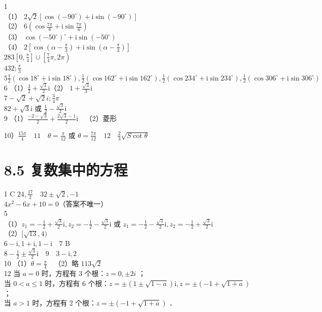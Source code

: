 \documentclass[10pt]{article}
\begin{document}
1\\
（1） \(2 \sqrt{2}\left[\cos \left(-90^{\circ}\right)+\mathrm{i} \sin \left(-90^{\circ}\right)\right]\)\\
（2） \(6\left(\cos \frac{7 \pi}{6}+\mathrm{i} \sin \frac{7 \pi}{6}\right)\)\\
（3） \(\cos \left(-50^{\circ}\right)^{\circ}+\mathrm{i} \sin \left(-50^{\circ}\right)\)\\
（4） \(2\left[\cos \left(\alpha-\frac{\pi}{3}\right)+\mathrm{i} \sin \left(\alpha-\frac{\pi}{3}\right)\right]\)\\
\(283\left[0, \frac{\pi}{4}\right] \cup\left[\frac{7}{4} \pi, 2 \pi\right)\)\\
\(432 ; \frac{\pi}{3}\)\\
\(5 \frac{1}{2}\left(\cos 18^{\circ}+\mathrm{i} \sin 18^{\circ}\right), \frac{1}{2}\left(\cos 162^{\circ}+\mathrm{i} \sin 162^{\circ}\right), \frac{1}{2}\left(\cos 234^{\circ}+\mathrm{i} \sin 234^{\circ}\right), \frac{1}{2}\left(\cos 306^{\circ}+\mathrm{i} \sin 306^{\circ}\right)\)\\
6 （1）\(\frac{3}{2}+\frac{\sqrt{3}}{2} \mathrm{i}\)（2） \(1+\frac{\sqrt{3}}{3} \mathrm{i}\)\\
\(7-\sqrt{2}+\sqrt{2} i ; \frac{3}{4} \pi\)\\
\(82+\sqrt{3} \mathrm{i}\) 或 \(\frac{1}{2}-\frac{\sqrt{3}}{2} \mathrm{i}\)\\
9 （1）\(\frac{-2-\sqrt{3}}{2}+\frac{2 \sqrt{3}-1}{2} \mathrm{i} \quad\)（2）菱形

10）\(\frac{15 \pi}{4} \quad 11 \quad \theta=\frac{\pi}{12}\) 或 \(\theta=\frac{7 \pi}{12} \quad 12 \quad \frac{2}{3} \sqrt{S \cot \theta}\)

\section*{8.5 复数集中的方程}
1 C \(24, \frac{17}{2} \quad 32 \pm \sqrt{2},-1\)\\
\(4 x^{2}-6 x+10=0\)（答案不唯一）\\
5\\
（1）\(z_{1}=-\frac{1}{2}+\frac{\sqrt{3}}{2} \mathrm{i}, z_{2}=-\frac{1}{2}-\frac{\sqrt{3}}{2} \mathrm{i}\) 或 \(z_{1}=-\frac{1}{2}-\frac{\sqrt{3}}{2} \mathrm{i}, z_{2}=-\frac{1}{2}+\frac{\sqrt{3}}{2} \mathrm{i}\)\\
（2）\([\sqrt{13}, 4)\)\\
\(6-\mathrm{i}, 1+\mathrm{i}, 1-\mathrm{i} \quad 7\) B\\
\(8-\frac{1}{2} \pm \frac{\sqrt{3}}{2} \mathrm{i} \quad 9 \quad 3-\mathrm{i}, 2\)\\
10 （1）\(\theta=\frac{\pi}{4} \quad\)（2）略 \(113 \sqrt{2}\)\\
12 当 \(a=0\) 时，方程有 3 个根：\(z=0, \pm 2 i\) ；\\
当 \(0<a \leqslant 1\) 时，方程有 6 个根：\(z= \pm(1 \pm \sqrt{1-a}) \mathrm{i}, z= \pm(-1+\sqrt{1+a})\) ；\\
当 \(a>1\) 时，方程有 2 个根：\(z= \pm(-1+\sqrt{1+a})\) ．
\end{document}
